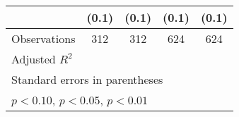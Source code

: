 \begin{table}[htbp]
\begin{tabular}{l*{4}{c}}
                &    (0.1)         &    (0.1)         &    (0.1)         &    (0.1)         \\
\hline
Observations    &      312         &      312         &      624         &      624         \\
Adjusted \(R^{2}\)&                  &                  &                  &                  \\
\hline\hline
\multicolumn{5}{l}{\footnotesize Standard errors in parentheses}\\
\multicolumn{5}{l}{\footnotesize \sym{*} \(p<0.10\), \sym{**} \(p<0.05\), \sym{***} \(p<0.01\)}\\
\end{tabular}
\end{table}
